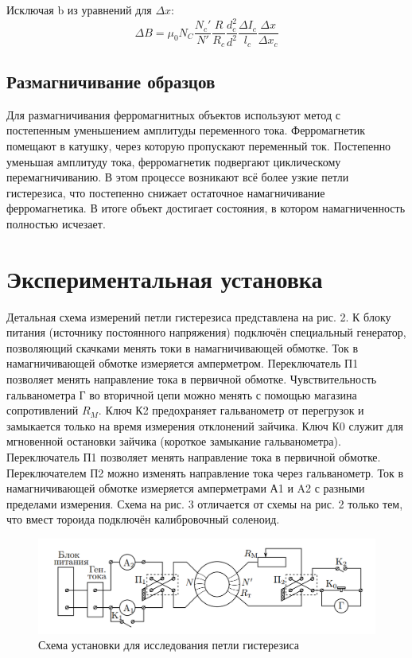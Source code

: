 \documentclass[a4paper, 12pt]{article}
\begin{document}
Исключая b из уравнений для $\Delta x$:
\begin{equation}
    \Delta B = \mu_0 N_{C} \frac{N_{c}'}{N'} \frac{R}{R_{c}} \frac{d_{c}^2}{d^2} \frac{\Delta I_{c}}{l_c} \frac{\Delta x}{\Delta x_{c}}
\end{equation}

\subsection{Размагничивание образцов}
Для размагничивания ферромагнитных объектов используют метод с постепенным уменьшением амплитуды переменного тока. Ферромагнетик помещают в катушку, через которую пропускают переменный ток. Постепенно уменьшая амплитуду тока, ферромагнетик подвергают циклическому перемагничиванию. В этом процессе возникают всё более узкие петли гистерезиса, что постепенно снижает остаточное намагничивание ферромагнетика. В итоге объект достигает состояния, в котором намагниченность полностью исчезает.

\section{Экспериментальная установка}

Детальная схема измерений петли гистерезиса представлена на
рис. 2. К блоку питания (источнику постоянного напряжения) подключён специальный генератор, позволяющий скачками менять токи в намагничивающей обмотке.
Ток в намагничивающей обмотке измеряется амперметром. Переключатель П1 позволяет менять направление тока в первичной обмотке.
Чувствительность гальванометра Г во вторичной цепи можно менять
с помощью магазина сопротивлений $R_{M}$. Ключ К2 предохраняет гальванометр от перегрузок и замыкается только на время измерения отклонений зайчика. Ключ К0 служит для мгновенной остановки зайчика (короткое замыкание гальванометра). Переключатель П1 позволяет менять направление тока в первичной обмотке. Переключателем П2 можно изменять направление тока через гальванометр. Ток в намагничивающей обмотке измеряется амперметрами А1 и A2 с разными пределами
измерения.
Схема на рис. 3 отличается от схемы на рис. 2 только тем, что вмест тороида подключён калибровочный соленоид.

\begin{figure}[!h]
\begin{center}
\includegraphics[width = 1\textwidth]{Снимок экрана 2024-11-27 235648.png}
\end{center}
\caption{Схема установки для исследования петли гистерезиса}
\end{figure}
\end{document}
